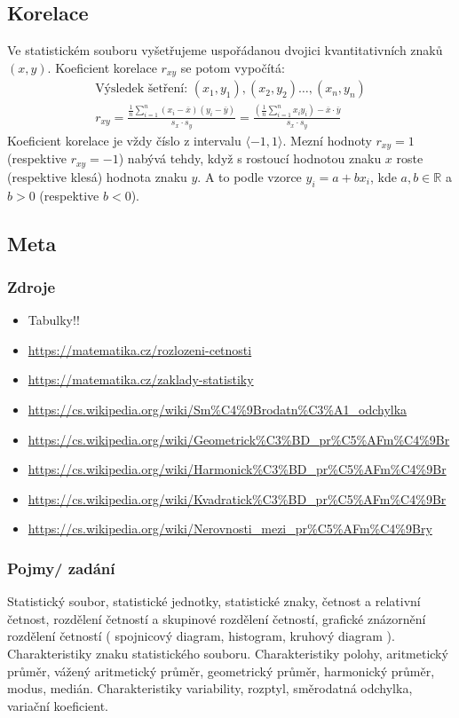 \documentclass[12pt]{article}
\begin{document}
\subsection{Korelace}
Ve statistickém souboru vyšetřujeme uspořádanou dvojici kvantitativních znaků $(x,y)$. Koeficient korelace $r_{xy}$ se potom vypočítá:
\begin{align}
\text{Výsledek šetření: 	} (x_1,y_1),(x_2,y_2) \dotsc, (x_n, y_n)\\
r_{xy} = \frac{\frac{1}{n} \sum\limits^n_{i=1}\left(x_i - \overline{x}\right) \left(y_i - \overline{y}\right)}{s_x \cdot s_y} = \frac{\left( \frac{1}{n} \sum\limits^n_{i=1}x_i y_i \right)-\overline{x}\cdot\overline{y}}{s_x \cdot s_y}
\end{align}
Koeficient korelace je vždy číslo z intervalu $\langle -1, 1 \rangle$. Mezní hodnoty $r_{xy} = 1$ (respektive $r_{xy} = -1$) nabývá tehdy, když s rostoucí hodnotou znaku $x$ roste (respektive klesá) hodnota znaku $y$. A to podle vzorce $y_i = a + b x_i$, kde $a,b \in \mathbb{R}$ a $b >0$ (respektive $b<0$). 
\subsection{Meta}
\subsubsection{Zdroje}
\begin{itemize}
\item Tabulky!!
\item \url{https://matematika.cz/rozlozeni-cetnosti}
\item \url{https://matematika.cz/zaklady-statistiky}
\item \url{https://cs.wikipedia.org/wiki/Sm\%C4\%9Brodatn\%C3\%A1_odchylka}
\item \url{https://cs.wikipedia.org/wiki/Geometrick\%C3\%BD_pr\%C5\%AFm\%C4\%9Br}
\item \url{https://cs.wikipedia.org/wiki/Harmonick\%C3\%BD_pr\%C5\%AFm\%C4\%9Br}
\item \url{https://cs.wikipedia.org/wiki/Kvadratick\%C3\%BD_pr\%C5\%AFm\%C4\%9Br}
\item \url{https://cs.wikipedia.org/wiki/Nerovnosti_mezi_pr\%C5\%AFm\%C4\%9Bry}
\end{itemize}
\subsubsection{Pojmy/ zadání}
Statistický soubor, statistické jednotky, statistické znaky, četnost a relativní četnost, rozdělení četností a skupinové rozdělení četností, grafické znázornění rozdělení četností ( spojnicový diagram, histogram, kruhový diagram ). Charakteristiky znaku statistického souboru. Charakteristiky polohy, aritmetický průměr, vážený aritmetický průměr, geometrický průměr, harmonický průměr, modus, medián. Charakteristiky variability, rozptyl, směrodatná odchylka, variační koeficient.
\end{document}
